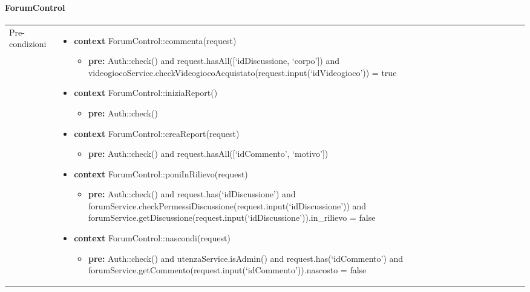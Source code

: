 \paragraph{ForumControl}
\small\begin{tabular}{|| l | p{28em} ||} 
\hline
Pre-condizioni & \begin{itemize}[leftmargin=*]
	\item \textbf{context} ForumControl::commenta(request)
	\begin{itemize}
		\item[ ] \textbf{pre:} Auth::check()
		and request.hasAll([‘idDiscussione, ‘corpo’])
		and videogiocoService.checkVideogiocoAcquistato(request.\newline input(‘idVideogioco’)) = true	
	\end{itemize}

	\item \textbf{context} ForumControl::iniziaReport()
	\begin{itemize}
		\item[ ] \textbf{pre:} Auth::check()	
	\end{itemize}

	\item \textbf{context} ForumControl::creaReport(request)
	\begin{itemize}
		\item[ ] \textbf{pre:} Auth::check()
		and request.hasAll([‘idCommento’, ‘motivo’])	
	\end{itemize}

	\item \textbf{context} ForumControl::poniInRilievo(request)
	\begin{itemize}
		\item[ ] \textbf{pre:} Auth::check() and request.has(‘idDiscussione’) and forumService\newline .checkPermessiDiscussione(request.input(‘idDiscussione’)) and forumService\newline .getDiscussione(request.input(‘idDiscussione’)).in\_rilievo = false
	\end{itemize}

	\item \textbf{context} ForumControl::nascondi(request)
	\begin{itemize}
		\item[ ] \textbf{pre:} Auth::check() and utenzaService.isAdmin() and request.has(‘idCommento’) and forumService.getCommento(request.input(‘idCommento’)).nascosto = false
	\end{itemize}


\end{itemize}
\end{tabular}
